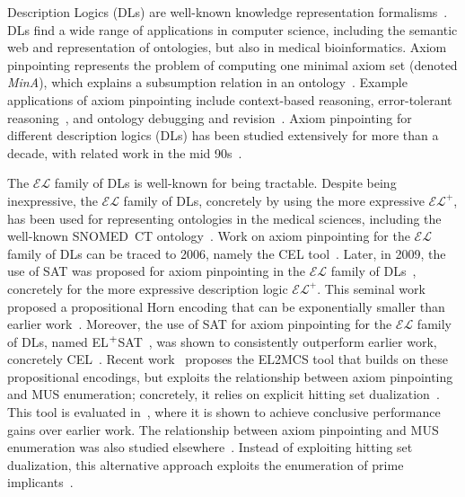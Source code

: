\documentclass{llncs}
\newcommand{\tn}{\textnormal}
\newcommand{\fml}[1]{{\mathcal{#1}}}
\newcommand{\elplus}{$\fml{EL}^{+}$\xspace}
\newcommand{\elplain}{$\fml{EL}$\xspace}
\newcommand{\elsat}{EL$^{\tn{+}}$SAT\xspace}
\begin{document}
Description Logics (DLs) are well-known knowledge representation
formalisms~\cite{baader-hdbk08}. DLs find a wide range of applications
in computer science, including the semantic web and representation
of ontologies, but also in medical bioinformatics. 
Axiom pinpointing represents the problem of computing one minimal axiom
set (denoted {\em MinA}), which explains a subsumption relation in an
ontology~\cite{schlobach-ijcai03}. 
Example applications of axiom pinpointing include context-based
reasoning, error-tolerant reasoning~\cite{ludwig-jelia14}, and
ontology debugging and revision~\cite{schlobach-jar07,kalyanpur-eswc06}.
Axiom pinpointing for different description logics (DLs) has been
studied extensively for more than a decade, with related work in the
mid
90s~\cite{baader-jar95,schlobach-ijcai03,parsia-www05,meyer-aaai06,baader-ijcar06,baader-ki07,parsia-iswc07,parsia-jws07,schlobach-jar07,baader-krmed08,sebastiani-cade09,baader-jlc10,meyer-rr11,nguyen-dl12,ludwig-ore14,sebastiani-tr15,ams-corr15,mp-tr15}.

The \elplain family of DLs is well-known for being tractable. Despite
being inexpressive, the \elplain family of DLs, concretely by using
the more expressive \elplus, has been used for representing ontologies
in the medical sciences, including the well-known SNOMED~CT
ontology~\cite{spackman-amia97}.
Work on axiom pinpointing for the \elplain family of DLs can be traced
to 2006, namely the CEL tool~\cite{baader-ijcar06}.
Later, in 2009, the use of SAT was proposed for axiom pinpointing in
the \elplain family of
DLs~\cite{sebastiani-cade09,vescovi-phd11,sebastiani-tr15}, concretely
for the more expressive description logic \elplus. This seminal work
proposed a propositional Horn encoding that can be exponentially
smaller than earlier
work~\cite{baader-ijcar06,baader-ki07,baader-krmed08}. Moreover, the
use of SAT for axiom pinpointing for the \elplain family of DLs, named 
\elsat~\cite{sebastiani-cade09,vescovi-phd11,sebastiani-tr15}, was
shown to consistently outperform earlier work, concretely
CEL~\cite{baader-ijcar06}. 
Recent work~\cite{ams-corr15} proposes the EL2MCS tool that builds on these propositional encodings,
but exploits the relationship between axiom pinpointing and MUS
enumeration; concretely, it relies on explicit hitting set dualization~\cite{liffiton-jar08}. 
This tool is evaluated in~\cite{ams-corr15}, where it is shown to achieve conclusive 
performance gains over earlier work.
The relationship between axiom pinpointing and MUS enumeration was
also studied elsewhere~\cite{mp-tr15}. Instead of exploiting hitting
set dualization, this alternative approach exploits the enumeration of
prime implicants~\cite{mp-tr15}.
\end{document}
